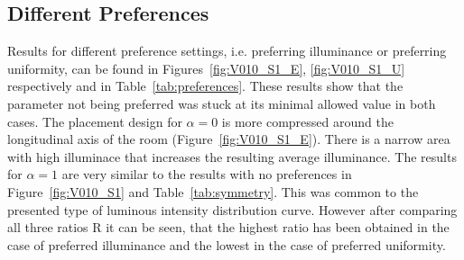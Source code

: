 \subsection{Different Preferences}

Results for different preference settings, i.e. preferring illuminance or preferring uniformity, can be found in Figures~\ref{fig:V010_S1_E}, \ref{fig:V010_S1_U} respectively and in Table~\ref{tab:preferences}. These results show that the parameter not being preferred was stuck at its minimal allowed value in both cases. The placement design for $\alpha = 0$ is more compressed around the longitudinal axis of the room (Figure~\ref{fig:V010_S1_E}). There is a narrow area with high illuminace that increases the resulting average illuminance. The results for $\alpha = 1$ are very similar to the results with no preferences in Figure~\ref{fig:V010_S1} and Table~\ref{tab:symmetry}. This was common to the presented type of luminous intensity distribution curve. However after comparing all three ratios R it can be seen, that the highest ratio has been obtained in the case of preferred illuminance and the lowest in the case of preferred uniformity.

